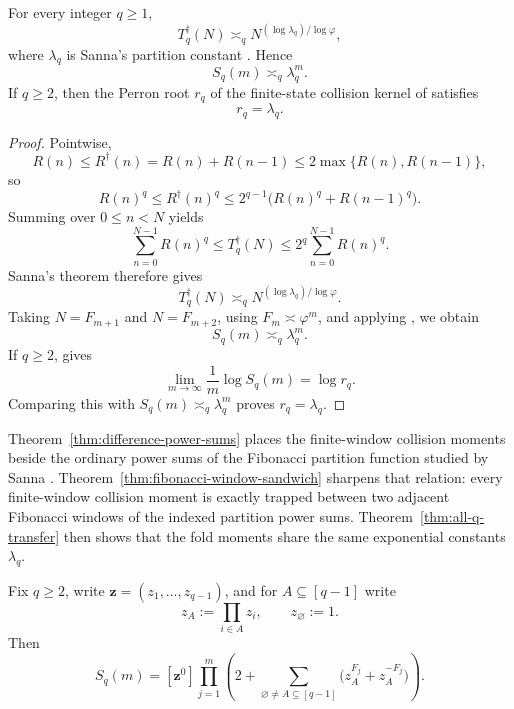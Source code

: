 \begin{theorem}
\label{thm:all-q-transfer}
For every integer \(q\ge 1\),
\[
  T_q^\dagger(N)\asymp_q N^{(\log \lambda_q)/\log\varphi},
\]
where \(\lambda_q\) is Sanna's partition constant \cite{Sanna2025}.  Hence
\[
  S_q(m)\asymp_q \lambda_q^m.
\]
If \(q\ge 2\), then the Perron root \(r_q\) of the finite-state collision
kernel of  satisfies
\[
  r_q=\lambda_q.
\]
\end{theorem}

\begin{proof}
Pointwise,
\[
  R(n)\le R^\dagger(n)=R(n)+R(n-1)\le 2\max\{R(n),R(n-1)\},
\]
so
\[
  R(n)^q\le R^\dagger(n)^q
  \le 2^{q-1}\bigl(R(n)^q+R(n-1)^q\bigr).
\]
Summing over \(0\le n<N\) yields
\[
  \sum_{n=0}^{N-1} R(n)^q
  \le
  T_q^\dagger(N)
  \le
  2^q\sum_{n=0}^{N-1} R(n)^q.
\]
Sanna's theorem therefore gives
\[
  T_q^\dagger(N)\asymp_q N^{(\log \lambda_q)/\log\varphi}.
\]
Taking \(N=F_{m+1}\) and \(N=F_{m+2}\), using \(F_m\asymp\varphi^m\), and
applying , we obtain
\[
  S_q(m)\asymp_q \lambda_q^m.
\]
If \(q\ge 2\),  gives
\[
  \lim_{m\to\infty}\frac{1}{m}\log S_q(m)=\log r_q.
\]
Comparing this with \(S_q(m)\asymp_q \lambda_q^m\) proves \(r_q=\lambda_q\).
\end{proof}

\begin{remark}
\label{rem:sanna-relation}
Theorem~\ref{thm:difference-power-sums} places the finite-window collision
moments beside the ordinary power sums of the Fibonacci partition function
studied by Sanna \cite{Sanna2025}.  Theorem~\ref{thm:fibonacci-window-sandwich}
sharpens that relation: every finite-window collision moment is exactly trapped
between two adjacent Fibonacci windows of the indexed partition power sums.
Theorem~\ref{thm:all-q-transfer} then shows that the fold moments share the
same exponential constants \(\lambda_q\).
\end{remark}

\begin{corollary}
\label{cor:multivariate-moment-kernel}
Fix \(q\ge 2\), write \(\mathbf z=(z_1,\dots,z_{q-1})\), and for
\(A\subseteq [q-1]\) write
\[
  z_A:=\prod_{i\in A}z_i,
  \qquad
  z_\varnothing:=1.
\]
Then
\[
  S_q(m)
  =
  [\mathbf z^0]
  \prod_{j=1}^m
  \left(
    2+\sum_{\varnothing\neq A\subseteq [q-1]}
    \bigl(z_A^{F_j}+z_A^{-F_j}\bigr)
  \right).
\]
\end{corollary}

